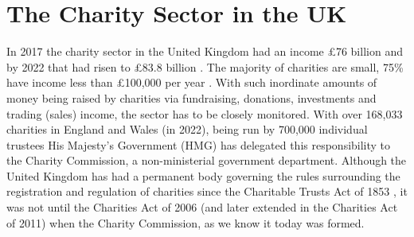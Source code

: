 \documentclass{UoYCSproject}
\begin{document}
\section{The Charity Sector in the UK}
In 2017 the charity sector in the United Kingdom had an income £76 billion \cite{commission_report_2017} and by 2022 that had risen to £83.8 billion \cite{commission_report_2022}. The majority of charities are small, 75\% have income less than £100,000 per year \cite{value_of_charity_sector_2017}. With such inordinate amounts of money being raised by charities via fundraising, donations, investments and trading (sales) income, the sector has to be closely monitored. With over 168,033 charities in England and Wales (in 2022), being run by 700,000 individual trustees \cite{commission_report_2022} His Majesty's Government (HMG) has delegated this responsibility to the Charity Commission, a non-ministerial government department. Although the United Kingdom has had a permanent body governing the rules surrounding the registration and regulation of charities since the Charitable Trusts Act of 1853 \cite{national_archives_1853_1960}, it was not until the Charities Act of 2006  \cite{charities_act_2006_introduction} (and later extended in the Charities Act of 2011) when the Charity Commission, as we know it today was formed. 
\end{document}
